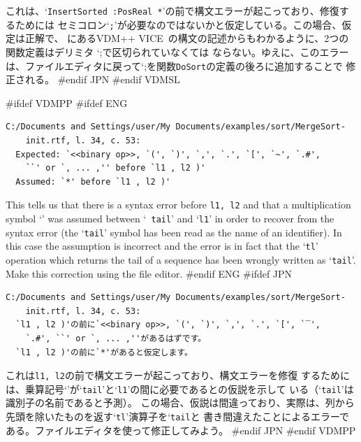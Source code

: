 \documentclass[\pformat,12pt]{article}
\newcommand{\vdmslpp}{VDM-SL}
\newcommand{\vdmslpp}{VDM++}
\renewcommand{\vdmslpp}{VDM++ VICE}
\newcommand{\Lit}[1]{`#1\Quote}
\newcommand{\aaa}{\tt }
\begin{document}
これは、`{\tt InsertSorted :PosReal *}'の前で構文エラーが起こっており、修復するためには
セミコロン`{\tt ;}'が必要なのではないかと仮定している。この場合、仮定は正解で、 \cite{UMLMan-SCSK}
にある\vdmslpp\ の構文の記述からもわかるように、2つの関数定義はデリミタ \Lit{;}で区切られていなくては
ならない。ゆえに、このエラーは、ファイルエディタに戻って\Lit{;}を関数{\aaa DoSort}の定義の後ろに追加することで
修正される。
#endif JPN
#endif VDMSL

#ifdef VDMPP
#ifdef ENG
\begin{verbatim}
C:/Documents and Settings/user/My Documents/examples/sort/MergeSort-
    init.rtf, l. 34, c. 53:
  Expected: `<<binary op>>, `(', `)', `,', `.', `[', `~', `.#',
    ``' or `, ... ,'' before `l1 , l2 )'
  Assumed: `*' before `l1 , l2 )'
\end{verbatim}

This tells us that there is a syntax error before {\tt l1, l2} and
that a multiplication symbol `{\tt *}' was assumed between `{\tt
  tail}' and `{\tt l1}' in order to recover from the syntax error (the
`{\tt tail}' symbol has been read as the name of an identifier). In
this case the assumption is incorrect and the error is in fact that
the `{\tt tl}' operation which returns the tail of a sequence has been
wrongly written as `{\tt tail}'. Make this correction using the file editor.
#endif ENG
#ifdef JPN
\begin{verbatim}
C:/Documents and Settings/user/My Documents/examples/sort/MergeSort-
    init.rtf, l. 34, c. 53:
  `l1 , l2 )'の前に`<<binary op>>, `(', `)', `,', `.', `[', `‾',
    `.#', ``' or `, ... ,''があるはずです。
  `l1 , l2 )'の前に`*'があると仮定します。
\end{verbatim}

これは{\tt l1, l2}の前で構文エラーが起こっており、構文エラーを修復
するためには、乗算記号`{\tt *}'が`{\tt tail}'と`{\tt l1}'の間に必要であるとの仮説を示して
いる（`{\tt tail}'は識別子の名前であると予測）。
この場合、仮説は間違っており、実際は、列から先頭を除いたものを返す`{\tt tl}'演算子を`{\tt tail}と
書き間違えたことによるエラーである。ファイルエディタを使って修正してみよう。
#endif JPN
#endif VDMPP
\end{document}
